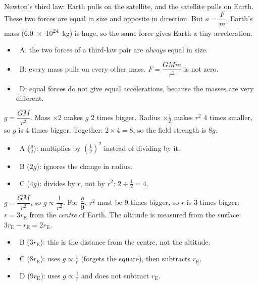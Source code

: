 \begin{practiceanswers}

\begin{practiceans}
  Newton's third law: Earth pulls on the satellite, and the satellite pulls on Earth. These two
  forces are equal in size and opposite in direction. But $a = \dfrac{F}{m}$. Earth's mass
  (\qty{6.0e24}{kg}) is huge, so the same force gives Earth a tiny acceleration.
  \begin{itemize}
    \item \xmark\ A: the two forces of a third-law pair are \emph{always} equal in size.
    \item \xmark\ B: every mass pulls on every other mass. $F = \dfrac{GMm}{r^2}$ is not zero.
    \item \xmark\ D: equal forces do not give equal accelerations, because the masses are very
          different.
  \end{itemize}
\end{practiceans}

\begin{practiceans}
  $g = \dfrac{GM}{r^2}$. Mass $\times 2$ makes $g$ 2 times bigger. Radius $\times \frac{1}{2}$
  makes $r^2$ 4 times smaller, so $g$ is 4 times bigger. Together: $2 \times 4 = 8$, so the field
  strength is $8g$.
  \begin{itemize}
    \item \xmark\ A ($\frac{g}{2}$): multiplies by $\left(\frac{1}{2}\right)^2$ instead of dividing by it.
    \item \xmark\ B ($2g$): ignores the change in radius.
    \item \xmark\ C ($4g$): divides by $r$, not by $r^2$: $2 \div \frac{1}{2} = 4$.
  \end{itemize}
\end{practiceans}

\begin{practiceans}
  $g = \dfrac{GM}{r^2}$, so $g \propto \dfrac{1}{r^2}$. For $\dfrac{g}{9}$, $r^2$ must be 9 times
  bigger, so $r$ is 3 times bigger: $r = 3r_\mathrm{E}$ from the \emph{centre} of Earth. The
  altitude is measured from the surface: $3r_\mathrm{E} - r_\mathrm{E} = 2r_\mathrm{E}$.
  \begin{itemize}
    \item \xmark\ B ($3r_\mathrm{E}$): this is the distance from the centre, not the altitude.
    \item \xmark\ C ($8r_\mathrm{E}$): uses $g \propto \frac{1}{r}$ (forgets the square), then subtracts
          $r_\mathrm{E}$.
    \item \xmark\ D ($9r_\mathrm{E}$): uses $g \propto \frac{1}{r}$ and does not subtract $r_\mathrm{E}$.
  \end{itemize}
\end{practiceans}


\end{practiceanswers}
